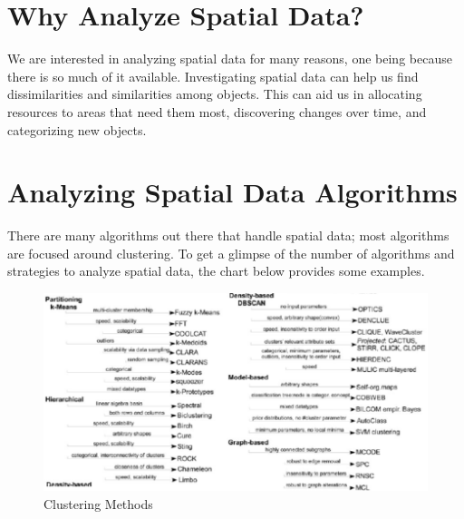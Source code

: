 \documentclass[12pt,twoside]{amherstthesis}
\begin{document}
  \section{Why Analyze Spatial Data?}\label{why-analyze-spatial-data}
  
  We are interested in analyzing spatial data for many reasons, one being
  because there is so much of it available. Investigating spatial data can
  help us find dissimilarities and similarities among objects. This can
  aid us in allocating resources to areas that need them most, discovering
  changes over time, and categorizing new objects.
  
  \section{Analyzing Spatial Data
  Algorithms}\label{analyzing-spatial-data-algorithms}
  
  There are many algorithms out there that handle spatial data; most
  algorithms are focused around clustering. To get a glimpse of the number
  of algorithms and strategies to analyze spatial data, the chart below
  provides some examples.
  
  \begin{Shaded}
  \begin{Highlighting}[]
  \NormalTok{(} \NormalTok{, }
         \NormalTok{, }
         \NormalTok{, } \NormalTok{, } \NormalTok{)}
  \end{Highlighting}
  \end{Shaded}
  
  \begin{figure}[htbp]
  \centering
  \includegraphics[scale = 0.5,angle = 0]{clustering_methods.png}
  \caption[Clustering Methods]{\normalsize{Clustering Methods}}
  \label{fig:Clustering}
  \end{figure}
  
\end{document}
